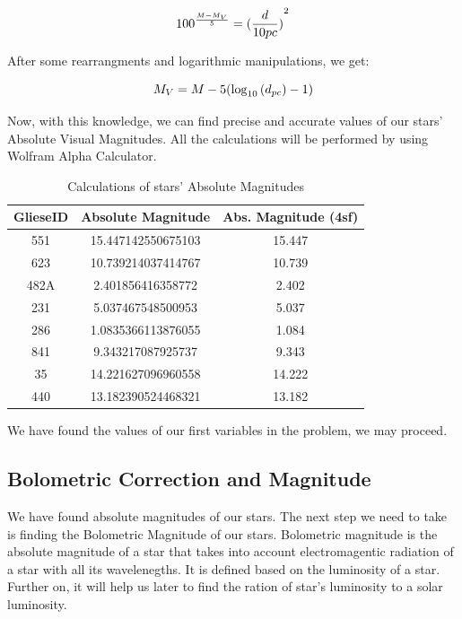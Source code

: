 \documentclass{article}
\begin{document}
  \begin{equation}
    {100}^{\frac{M-M_V}{5}} = {(\frac{d}{10pc})}^2\\
  \end{equation}

  After some rearrangments and logarithmic manipulations, we get:

  \begin{equation}
    M_V = M - 5(\log_{10}{(d_{pc})}-1)\\
    \end{equation}
    
  Now, with this knowledge, we can find precise and accurate values of our stars' Absolute Visual Magnitudes. All the calculations will
  be performed by using Wolfram Alpha Calculator.\\
  
\begin{table}[h!]
    \begin{center}
      \caption{Calculations of stars' Absolute Magnitudes}
      \begin{tabular}{c | c | c}
        \textbf{GlieseID} & \textbf{Absolute Magnitude} & \textbf{Abs. Magnitude (4sf)}\\
        \hline
        551  & 15.447142550675103 & 15.447\\
        623  & 10.739214037414767 & 10.739\\
        482A & 2.401856416358772  & 2.402\\
        231  & 5.037467548500953  & 5.037\\
        286  & 1.0835366113876055 & 1.084\\
        841  & 9.343217087925737  & 9.343\\
        35   & 14.221627096960558 & 14.222\\
        440  & 13.182390524468321 & 13.182\\
        
      \end{tabular}
      \label{avm}
    \end{center}
  \end{table}
  
We have found the values of our first variables in the problem, we may proceed.

\subsection{Bolometric Correction and Magnitude}
\label{bcm}
We have found absolute magnitudes of our stars. The next step we need to take is finding the Bolometric Magnitude of our stars. Bolometric magnitude is the absolute magnitude of a star that takes into account electromagentic radiation of a star with all its wavelenegths. It is defined based on the luminosity of a star. Further on, it will help us later to find the ration of star's luminosity to a solar luminosity.\\
\end{document}

